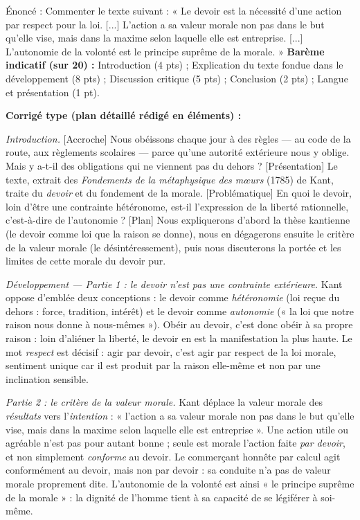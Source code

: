 \documentclass[11pt]{article}
\begin{document}
\begin{exoresolu}
Énoncé : Commenter le texte suivant : « Le devoir est la nécessité d'une action par respect pour la loi. [...] L'action a sa valeur morale non pas dans le but qu'elle vise, mais dans la maxime selon laquelle elle est entreprise. [...] L'autonomie de la volonté est le principe suprême de la morale. »
\tcblower
\textbf{Barème indicatif (sur 20) :} Introduction (4 pts) ; Explication du texte fondue dans le développement (8 pts) ; Discussion critique (5 pts) ; Conclusion (2 pts) ; Langue et présentation (1 pt).

\textbf{Corrigé type (plan détaillé rédigé en éléments) :}

\emph{Introduction.} [Accroche] Nous obéissons chaque jour à des règles — au code de la route, aux règlements scolaires — parce qu'une autorité extérieure nous y oblige. Mais y a-t-il des obligations qui ne viennent pas du dehors ? [Présentation] Le texte, extrait des \emph{Fondements de la métaphysique des mœurs} (1785) de Kant, traite du \emph{devoir} et du fondement de la morale. [Problématique] En quoi le devoir, loin d'être une contrainte hétéronome, est-il l'expression de la liberté rationnelle, c'est-à-dire de l'autonomie ? [Plan] Nous expliquerons d'abord la thèse kantienne (le devoir comme loi que la raison se donne), nous en dégagerons ensuite le critère de la valeur morale (le désintéressement), puis nous discuterons la portée et les limites de cette morale du devoir pur.

\emph{Développement — Partie 1 : le devoir n'est pas une contrainte extérieure.} Kant oppose d'emblée deux conceptions : le devoir comme \emph{hétéronomie} (loi reçue du dehors : force, tradition, intérêt) et le devoir comme \emph{autonomie} (« la loi que notre raison nous donne à nous-mêmes »). Obéir au devoir, c'est donc obéir à sa propre raison : loin d'aliéner la liberté, le devoir en est la manifestation la plus haute. Le mot \emph{respect} est décisif : agir par devoir, c'est agir par respect de la loi morale, sentiment unique car il est produit par la raison elle-même et non par une inclination sensible.

\emph{Partie 2 : le critère de la valeur morale.} Kant déplace la valeur morale des \emph{résultats} vers l'\emph{intention} : « l'action a sa valeur morale non pas dans le but qu'elle vise, mais dans la maxime selon laquelle elle est entreprise ». Une action utile ou agréable n'est pas pour autant bonne ; seule est morale l'action faite \emph{par devoir}, et non simplement \emph{conforme} au devoir. Le commerçant honnête par calcul agit conformément au devoir, mais non par devoir : sa conduite n'a pas de valeur morale proprement dite. L'autonomie de la volonté est ainsi « le principe suprême de la morale » : la dignité de l'homme tient à sa capacité de se légiférer à soi-même.


\end{exoresolu}
\end{document}
